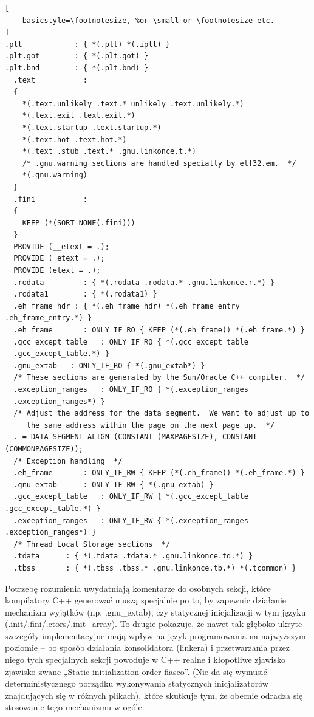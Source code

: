 \begin{lstlisting}[
    basicstyle=\footnotesize, %or \small or \footnotesize etc.
]
.plt            : { *(.plt) *(.iplt) }
.plt.got        : { *(.plt.got) }
.plt.bnd        : { *(.plt.bnd) }
  .text           :
  {
    *(.text.unlikely .text.*_unlikely .text.unlikely.*)
    *(.text.exit .text.exit.*)
    *(.text.startup .text.startup.*)
    *(.text.hot .text.hot.*)
    *(.text .stub .text.* .gnu.linkonce.t.*)
    /* .gnu.warning sections are handled specially by elf32.em.  */
    *(.gnu.warning)
  }
  .fini           :
  {
    KEEP (*(SORT_NONE(.fini)))
  }
  PROVIDE (__etext = .);
  PROVIDE (_etext = .);
  PROVIDE (etext = .);
  .rodata         : { *(.rodata .rodata.* .gnu.linkonce.r.*) }
  .rodata1        : { *(.rodata1) }
  .eh_frame_hdr : { *(.eh_frame_hdr) *(.eh_frame_entry .eh_frame_entry.*) }
  .eh_frame       : ONLY_IF_RO { KEEP (*(.eh_frame)) *(.eh_frame.*) }
  .gcc_except_table   : ONLY_IF_RO { *(.gcc_except_table
  .gcc_except_table.*) }
  .gnu_extab   : ONLY_IF_RO { *(.gnu_extab*) }
  /* These sections are generated by the Sun/Oracle C++ compiler.  */
  .exception_ranges   : ONLY_IF_RO { *(.exception_ranges
  .exception_ranges*) }
  /* Adjust the address for the data segment.  We want to adjust up to
     the same address within the page on the next page up.  */
  . = DATA_SEGMENT_ALIGN (CONSTANT (MAXPAGESIZE), CONSTANT (COMMONPAGESIZE));
  /* Exception handling  */
  .eh_frame       : ONLY_IF_RW { KEEP (*(.eh_frame)) *(.eh_frame.*) }
  .gnu_extab      : ONLY_IF_RW { *(.gnu_extab) }
  .gcc_except_table   : ONLY_IF_RW { *(.gcc_except_table .gcc_except_table.*) }
  .exception_ranges   : ONLY_IF_RW { *(.exception_ranges .exception_ranges*) }
  /* Thread Local Storage sections  */
  .tdata	  : { *(.tdata .tdata.* .gnu.linkonce.td.*) }
  .tbss		  : { *(.tbss .tbss.* .gnu.linkonce.tb.*) *(.tcommon) }
\end{lstlisting}

Potrzebę rozumienia uwydatniają komentarze do osobnych sekcji, które kompilatory C++ generować muszą specjalnie po to, by zapewnic działanie mechanizm wyjątków (np. .gnu\_extab), czy statycznej inicjalizacji w tym języku (.init/.fini/.ctors/.init\_array). To drugie pokazuje, że nawet tak głęboko ukryte szczegóły implementacyjne mają wpływ na język programowania na najwyższym poziomie – bo sposób działania konsolidatora (linkera) i przetwarzania przez niego tych specjalnych sekcji powoduje w C++ realne i kłopotliwe zjawisko zjawisko zwane „Static initialization order fiasco”\cite{siof}. (Nie da się wymusić deterministycznego porządku wykonywania statycznych inicjalizatorów znajdujących się w różnych plikach), które skutkuje tym, że obecnie odradza się stosowanie tego mechanizmu w ogóle\cite{google_cpp_guidelines_static}.

